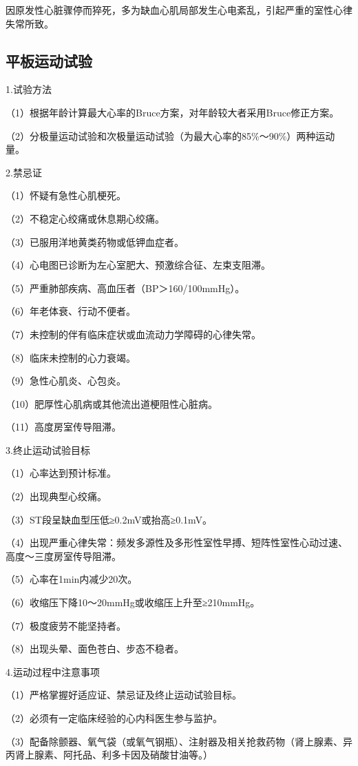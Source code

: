 因原发性心脏骤停而猝死，多为缺血心肌局部发生心电紊乱，引起严重的室性心律失常所致。

\protect\hypertarget{text00050.htmlux5cux23subid592}{}{}

\subsection{平板运动试验}

1.试验方法

（1）根据年龄计算最大心率的Bruce方案，对年龄较大者采用Bruce修正方案。

（2）分极量运动试验和次极量运动试验（为最大心率的85\%～90\%）两种运动量。

2.禁忌证

（1）怀疑有急性心肌梗死。

（2）不稳定心绞痛或休息期心绞痛。

（3）已服用洋地黄类药物或低钾血症者。

（4）心电图已诊断为左心室肥大、预激综合征、左束支阻滞。

（5）严重肺部疾病、高血压者（BP＞160/100mmHg）。

（6）年老体衰、行动不便者。

（7）未控制的伴有临床症状或血流动力学障碍的心律失常。

（8）临床未控制的心力衰竭。

（9）急性心肌炎、心包炎。

（10）肥厚性心肌病或其他流出道梗阻性心脏病。

（11）高度房室传导阻滞。

3.终止运动试验目标

（1）心率达到预计标准。

（2）出现典型心绞痛。

（3）ST段呈缺血型压低≥0.2mV或抬高≥0.1mV。

（4）出现严重心律失常：频发多源性及多形性室性早搏、短阵性室性心动过速、高度～三度房室传导阻滞。

（5）心率在1min内减少20次。

（6）收缩压下降10～20mmHg或收缩压上升至≥210mmHg。

（7）极度疲劳不能坚持者。

（8）出现头晕、面色苍白、步态不稳者。

4.运动过程中注意事项

（1）严格掌握好适应证、禁忌证及终止运动试验目标。

（2）必须有一定临床经验的心内科医生参与监护。

（3）配备除颤器、氧气袋（或氧气钢瓶）、注射器及相关抢救药物（肾上腺素、异丙肾上腺素、阿托品、利多卡因及硝酸甘油等。）

